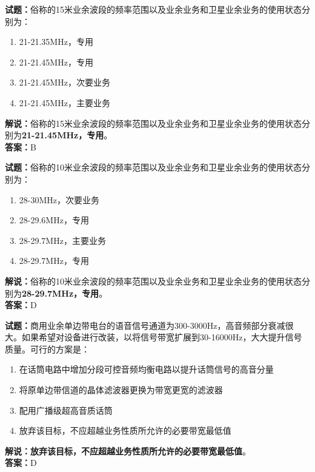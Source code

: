 \documentclass{ctexbook}
\begin{document}
\bigskip




\noindent\textbf{试题：}俗称的15米业余波段的频率范围以及业余业务和卫星业余业务的使用状态分别为：
\begin{enumerate}[leftmargin=3em]
\item 21-21.35\unit{\MHz}，专用
\item 21-21.45\unit{\MHz}，专用
\item 21-21.45\unit{\MHz}，次要业务
\item 21-21.45\unit{\MHz}，主要业务
\end{enumerate}
\noindent\textbf{解说：}俗称的15米业余波段的频率范围以及业余业务和卫星业余业务的使用状态分别为\textbf{21-21.45\unit{\MHz}，专用}。\\\noindent\textbf{答案：}B

\bigskip




\noindent\textbf{试题：}俗称的10米业余波段的频率范围以及业余业务和卫星业余业务的使用状态分别为：
\begin{enumerate}[leftmargin=3em]
\item 28-30\unit{\MHz}，次要业务
\item 28-29.6\unit{\MHz}，专用
\item 28-29.7\unit{\MHz}，主要业务
\item 28-29.7\unit{\MHz}，专用
\end{enumerate}
\noindent\textbf{解说：}俗称的10米业余波段的频率范围以及业余业务和卫星业余业务的使用状态分别为\textbf{28-29.7\unit{\MHz}，专用}。\\\noindent\textbf{答案：}D

\bigskip




\noindent\textbf{试题：}商用业余单边带电台的语音信号通道为300-3000Hz，高音频部分衰减很大。如果希望对设备进行改装，以将信号带宽扩展到30-16000Hz，大大提升信号质量。可行的方案是：
\begin{enumerate}[leftmargin=3em]
\item 在话筒电路中增加分段可控音频均衡电路以提升话筒信号的高音分量
\item 将原单边带信道的晶体滤波器更换为带宽更宽的滤波器
\item 配用广播级超高音质话筒
\item 放弃该目标，不应超越业务性质所允许的必要带宽最低值
\end{enumerate}
\noindent\textbf{解说：}\textbf{放弃该目标，不应超越业务性质所允许的必要带宽最低值}。\\\noindent\textbf{答案：}D
\end{document}
